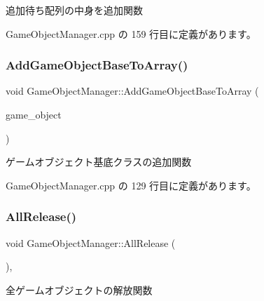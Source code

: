 追加待ち配列の中身を追加関数 



 Game\+Object\+Manager.\+cpp の 159 行目に定義があります。

\mbox{\label{class_game_object_manager_ab42e8ca2c7e586d05d513e8a868a86ef}} 
\subsubsection{\texorpdfstring{Add\+Game\+Object\+Base\+To\+Array()}{AddGameObjectBaseToArray()}}
{\footnotesize\ttfamily void Game\+Object\+Manager\+::\+Add\+Game\+Object\+Base\+To\+Array (\begin{DoxyParamCaption}\item[{\mbox{\hyperlink{class_game_object_base}{Game\+Object\+Base}} $\ast$}]{game\+\_\+object }\end{DoxyParamCaption})\hspace{0.3cm}{\ttfamily [static]}}



ゲームオブジェクト基底クラスの追加関数 



 Game\+Object\+Manager.\+cpp の 129 行目に定義があります。

\mbox{\label{class_game_object_manager_a58e1266da3b18a4c0bded551e386c6ae}} 
\subsubsection{\texorpdfstring{All\+Release()}{AllRelease()}}
{\footnotesize\ttfamily void Game\+Object\+Manager\+::\+All\+Release (\begin{DoxyParamCaption}{ }\end{DoxyParamCaption})\hspace{0.3cm}{\ttfamily [static]}, {\ttfamily [private]}}



全ゲームオブジェクトの解放関数 



